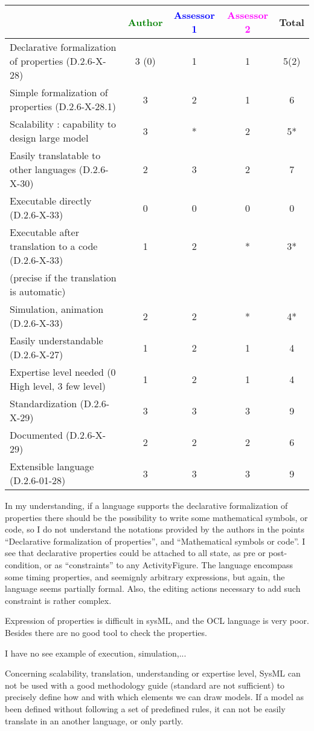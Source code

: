 \begin{tabular}{|l | c | c | c | c|}
\hline
& \textcolor{green}{Author} & \textcolor{blue}{Assessor 1} & \textcolor{magenta}{Assessor 2} & Total \\
\hline
Declarative formalization of properties (D.2.6-X-28) & 3 (0) & 1 & 1 & 5(2) \\
\hline
Simple formalization of properties (D.2.6-X-28.1) & 3 &  2 & 1 & 6 \\
\hline
Scalability : capability to design large model & 3 & * & 2 & 5* \\
\hline
Easily translatable to other languages (D.2.6-X-30) & 2 & 3 & 2 & 7 \\
\hline
Executable directly (D.2.6-X-33) & 0 & 0 & 0 & 0 \\
\hline
Executable after translation to a code (D.2.6-X-33) & 1 & 2 & * & 3* \\
(precise if the translation is automatic) & & & & \\
\hline
Simulation, animation (D.2.6-X-33) & 2 & 2 & * & 4* \\
\hline
Easily understandable (D.2.6-X-27) & 1 & 2 &  1 & 4 \\
\hline
Expertise level needed (0 High level, 3 few level) & 1 & 2 &  1 & 4 \\
\hline
Standardization (D.2.6-X-29) & 3 & 3 & 3 & 9 \\
\hline
Documented (D.2.6-X-29) & 2 & 2 & 2 & 6 \\
\hline
Extensible language (D.2.6-01-28) & 3 & 3 & 3 & 9 \\
\hline
\end{tabular}

\begin{assessor1}
In my understanding, if a language supports the declarative formalization of properties there should be the possibility to write some mathematical symbols, or code, so I do not understand the notations provided by the authors in the points
"`Declarative formalization of properties"', and "`Mathematical symbols or code"'. I see that declarative properties could be attached to all state, as pre or post-condition, or as "`constraints"' to any ActivityFigure. The language encompass some timing properties, and seemignly arbitrary expressions, but again, the language seems partially formal. Also, the editing actions necessary to add such constraint is rather complex. 
\end{assessor1}

\begin{assessor2}
Expression of properties is difficult in sysML, and the OCL language is very poor. Besides there are no good tool to check the properties. 

I have no see example of execution, simulation,...

Concerning scalability, translation, understanding or expertise level, SysML can not be used with a good methodology guide (standard are not sufficient)  to  precisely define how and with which elements we can draw models. If a model as been defined without following a set of predefined rules, it can not be easily translate in an another language, or only  partly.
\end{assessor2}

